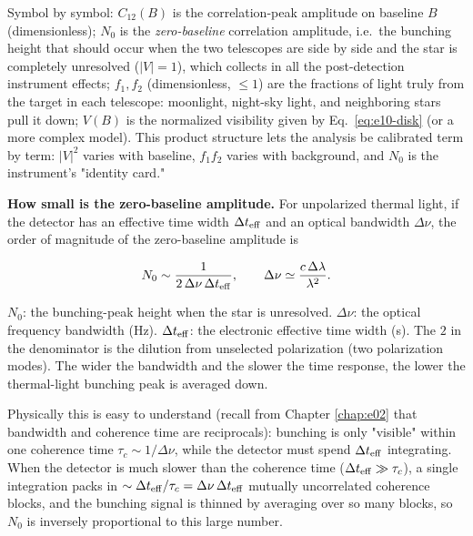 Symbol by symbol: \(C_{12}(B)\) is the correlation-peak amplitude on baseline \(B\) (dimensionless); \(N_0\) is the \emph{zero-baseline} correlation amplitude, i.e.\ the bunching height that should occur when the two telescopes are side by side and the star is completely unresolved (\(|V|=1\)), which collects in all the post-detection instrument effects; \(f_1,f_2\) (dimensionless, \(\le1\)) are the fractions of light truly from the target in each telescope: moonlight, night-sky light, and neighboring stars pull it down; \(V(B)\) is the normalized visibility given by Eq.~\eqref{eq:e10-disk} (or a more complex model). This product structure lets the analysis be calibrated term by term: \(|V|^2\) varies with baseline, \(f_1f_2\) varies with background, and \(N_0\) is the instrument's "identity card."

\textbf{How small is the zero-baseline amplitude.} For unpolarized thermal light, if the detector has an effective time width \(\Delta t_{\rm eff}\) and an optical bandwidth \(\Delta\nu\), the order of magnitude of the zero-baseline amplitude is

\begin{equation}
  N_0\sim\frac{1}{2\,\Delta\nu\,\Delta t_{\rm eff}},\qquad
  \Delta\nu\simeq\frac{c\,\Delta\lambda}{\lambda^2}.
  \label{eq:e10-n0}
\end{equation}
\begin{formulaexplain}
\(N_0\): the bunching-peak height when the star is unresolved. \(\Delta\nu\): the optical frequency bandwidth (Hz). \(\Delta t_{\rm eff}\): the electronic effective time width (s). The \(2\) in the denominator is the dilution from unselected polarization (two polarization modes). The wider the bandwidth and the slower the time response, the lower the thermal-light bunching peak is averaged down.
\end{formulaexplain}

Physically this is easy to understand (recall from Chapter \ref{chap:e02} that bandwidth and coherence time are reciprocals): bunching is only "visible" within one coherence time \(\tau_c\sim1/\Delta\nu\), while the detector must spend \(\Delta t_{\rm eff}\) integrating. When the detector is much slower than the coherence time (\(\Delta t_{\rm eff}\gg\tau_c\)), a single integration packs in \(\sim\Delta t_{\rm eff}/\tau_c=\Delta\nu\,\Delta t_{\rm eff}\) mutually uncorrelated coherence blocks, and the bunching signal is thinned by averaging over so many blocks, so \(N_0\) is inversely proportional to this large number.

